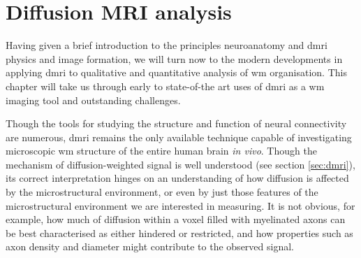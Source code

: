 \chapter{Diffusion MRI analysis}\label{chap:neuroimaging}

Having given a brief introduction to the principles neuroanatomy and \gls{dmri} physics and image formation, we will turn now to the modern developments in applying \gls{dmri} to qualitative and quantitative analysis of \gls{wm} organisation.
This chapter will take us through early to state-of-the art uses of \gls{dmri} as a \gls{wm} imaging tool and outstanding challenges.

Though the tools for studying the structure and function of neural connectivity are numerous, \gls{dmri} remains the only available technique capable of investigating microscopic \gls{wm} structure of the entire human brain \textit{in vivo}.
Though the mechanism of diffusion-weighted signal is well understood (see section \ref{sec:dmri}), its correct interpretation hinges on an understanding of how diffusion is affected by the microstructural environment\autocite{LeBihan1995}, or even by just those features of the microstructural environment we are interested in measuring.
It is not obvious, for example, how much of diffusion within a voxel filled with myelinated axons can be best characterised as either hindered or restricted, and how properties such as axon density and diameter might contribute to the observed signal.\autocite{Panagiotaki2012}

